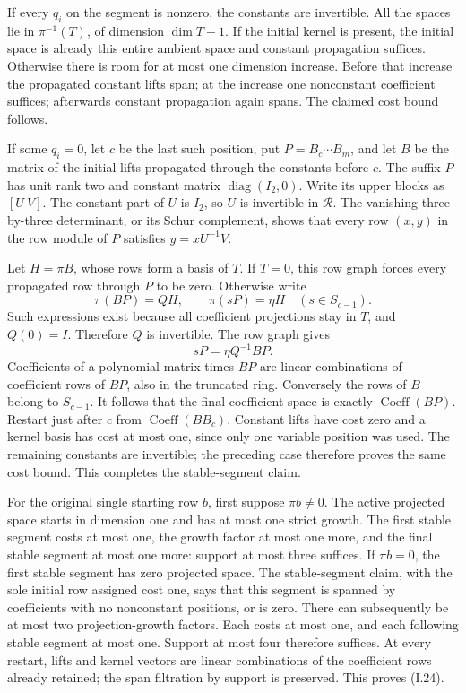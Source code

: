 If every $q_i$ on the segment is nonzero, the constants are invertible.
All the spaces lie in $\pi^{-1}(T)$, of dimension $\dim T+1$.
If the initial kernel is present, the initial space is already this
entire ambient space and constant propagation suffices.  Otherwise
there is room for at most one dimension increase.  Before that
increase the propagated constant lifts span; at the increase one
nonconstant coefficient suffices; afterwards constant propagation
again spans.  The claimed cost bound follows.

If some $q_i=0$, let $c$ be the last such position, put
$P=B_c\cdots B_m$, and let $B$ be the matrix of the initial lifts
propagated through the constants before $c$.  The suffix $P$ has
unit rank two and constant matrix $\operatorname{diag}(I_2,0)$.
Write its upper blocks as $[U\ V]$.  The constant part of $U$ is
$I_2$, so $U$ is invertible in $\mathcal R$.  The vanishing
three-by-three determinant, or its Schur complement, shows that
every row $(x,y)$ in the row module of $P$ satisfies
$y=xU^{-1}V$.

Let $H=\pi B$, whose rows form a basis of $T$.  If $T=0$, this row
graph forces every propagated row through $P$ to be zero.  Otherwise
write
\[
 \pi(BP)=QH,\qquad \pi(sP)=\eta H\quad(s\in S_{c-1}).
\]
Such expressions exist because all coefficient projections stay in
$T$, and $Q(0)=I$.  Therefore $Q$ is invertible.  The row graph gives
\[
 sP=\eta Q^{-1}BP.
 \tag{I.26}
\]
Coefficients of a polynomial matrix times $BP$ are linear
combinations of coefficient rows of $BP$, also in the truncated
ring.  Conversely the rows of $B$ belong to $S_{c-1}$.  It follows
that the final coefficient space is exactly
$\operatorname{Coeff}(BP)$.
Restart just after $c$ from $\operatorname{Coeff}(BB_c)$.
Constant lifts have cost zero and a kernel basis has cost at most
one, since only one variable position was used.  The remaining
constants are invertible; the preceding case therefore proves the
same cost bound.  This completes the stable-segment claim.

For the original single starting row $b$, first suppose $\pi b\ne0$.
The active projected space starts in dimension one and has at most
one strict growth.  The first stable segment costs at most one,
the growth factor at most one more, and the final stable segment
at most one more: support at most three suffices.  If $\pi b=0$,
the first stable segment has zero projected space.  The
stable-segment claim, with the sole initial row assigned cost one,
says that this segment is spanned by coefficients with no
nonconstant positions, or is zero.  There can subsequently be at
most two projection-growth factors.  Each costs at most one, and
each following stable segment at most one.  Support at most four
therefore suffices.  At every restart, lifts and kernel vectors
are linear combinations of the coefficient rows already retained;
the span filtration by support is preserved.  This proves (I.24).

